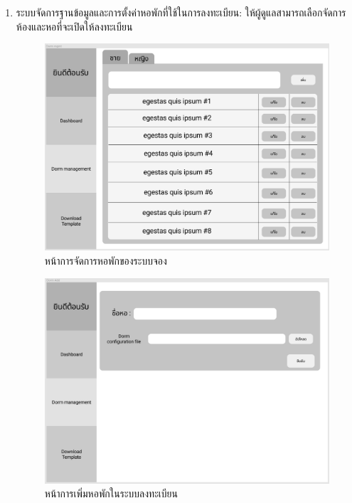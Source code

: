 \begin{enumerate}
  \clearpage
  \item ระบบจัดการฐานข้อมูลและการตั้งค่าหอพักที่ใช้ในการลงทะเบียน: ให้ผู้ดูแลสามารถเลือกจัดการห้องและหอที่จะเปิดให้ลงทะเบียน
  \begin{figure}[h]
  \begin{center}
  \includegraphics[width=\linewidth]{photo/dormmgmt.png}
  \end{center}
  \caption{หน้าการจัดการหอพักของระบบจอง}
  \label{fig:mgmt}
  \end{figure}
  \begin{figure}[h]
  \begin{center}
  \includegraphics[width=\linewidth]{photo/dormadd.png}
  \end{center}
  \caption{หน้าการเพิ่มหอพักในระบบลงทะเบียน}
  \label{fig:add-dorm}
  \end{figure}
  

\end{enumerate}
